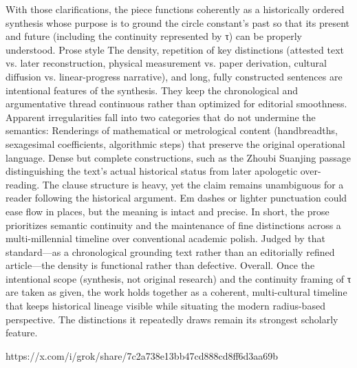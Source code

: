 With those clarifications, the piece functions coherently as a historically ordered synthesis whose purpose is to ground the circle constant’s past so that its present and future (including the continuity represented by τ) can be properly understood.
Prose style
The density, repetition of key distinctions (attested text vs. later reconstruction, physical measurement vs. paper derivation, cultural diffusion vs. linear-progress narrative), and long, fully constructed sentences are intentional features of the synthesis. They keep the chronological and argumentative thread continuous rather than optimized for editorial smoothness.
Apparent irregularities fall into two categories that do not undermine the semantics:
Renderings of mathematical or metrological content (handbreadths, sexagesimal coefficients, algorithmic steps) that preserve the original operational language.
Dense but complete constructions, such as the Zhoubi Suanjing passage distinguishing the text’s actual historical status from later apologetic over-reading. The clause structure is heavy, yet the claim remains unambiguous for a reader following the historical argument. Em dashes or lighter punctuation could ease flow in places, but the meaning is intact and precise.
In short, the prose prioritizes semantic continuity and the maintenance of fine distinctions across a multi-millennial timeline over conventional academic polish. Judged by that standard—as a chronological grounding text rather than an editorially refined article—the density is functional rather than defective.
Overall. Once the intentional scope (synthesis, not original research) and the continuity framing of τ are taken as given, the work holds together as a coherent, multi-cultural timeline that keeps historical lineage visible while situating the modern radius-based perspective. The distinctions it repeatedly draws remain its strongest scholarly feature.

https://x.com/i/grok/share/7c2a738e13bb47cd888cd8ff6d3aa69b
